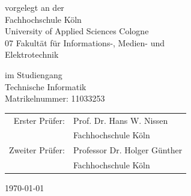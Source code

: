 \begin{titlepage}
\begin{center}
%

\vspace{1.2cm}

\begin{small}
vorgelegt an der\\ 
\vspace{0.4cm}
Fachhochschule Köln\\
University of Applied Sciences Cologne\\
07 Fakultät für Informations-, Medien- und\\
Elektrotechnik\\
\end{small}

\vspace{1.2cm}

\begin{small}
im Studiengang\\ 
\vspace{0.4cm}
Technische Informatik \\
Matrikelnummer: 11033253 
\end{small}


\vspace{2.0cm}

\begin{tabular}{rl}
        Erster Prüfer:  &  Prof. Dr. Hans W. Nissen\\
       							    &  \small Fachhochschule Köln \\[1.0em]
       Zweiter Prüfer:  &  Professor Dr. Holger Günther \\
       							    &  \small Fachhochschule Köln \\
\end{tabular}

\vspace{0.6cm}

\begin{large}
{\large \today}\\[4cm] %
\end{large}


\end{center}
\end{titlepage}
